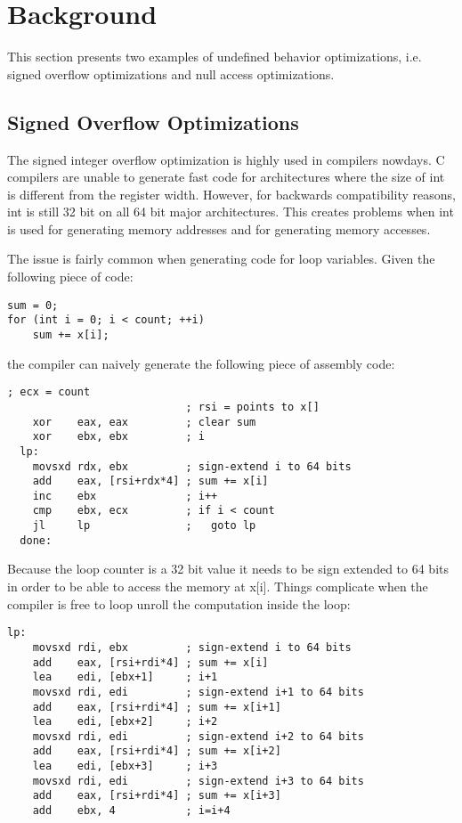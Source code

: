 \section{Background} \label{sec:bg}

This section presents two examples of undefined behavior optimizations,
i.e. signed overflow optimizations and null access optimizations.

\subsection{Signed Overflow Optimizations}
The signed integer overflow optimization is highly used in compilers
nowdays. C compilers are unable to generate fast code for
architectures where the size of int is different from the register
width. However, for backwards compatibility reasons, int is still 32 bit
on all 64 bit major architectures. This creates problems when int is
used for generating memory addresses and for generating memory accesses.

The issue is fairly common when generating code for loop variables.
Given the following piece of code:
\begin{lstlisting}[style=Cstyle, caption={}, label={}]
sum = 0;
for (int i = 0; i < count; ++i)
	sum += x[i];
\end{lstlisting}
the compiler can naively generate the following piece of assembly code:
\begin{lstlisting}[style=Cstyle, caption={}, label={}]
                            ; ecx = count
                            ; rsi = points to x[]
    xor    eax, eax         ; clear sum
    xor    ebx, ebx         ; i
  lp:
    movsxd rdx, ebx         ; sign-extend i to 64 bits
    add    eax, [rsi+rdx*4] ; sum += x[i]
    inc    ebx              ; i++
    cmp    ebx, ecx         ; if i < count
    jl     lp               ;   goto lp
  done:
\end{lstlisting}

Because the loop counter is a 32 bit value it needs to be sign extended
to 64 bits in order to be able to access the memory at x[i]. Things
complicate when the compiler is free to loop unroll the computation
inside the loop:
\begin{lstlisting}[style=Cstyle, caption={}, label={}]
  lp:
    movsxd rdi, ebx         ; sign-extend i to 64 bits
    add    eax, [rsi+rdi*4] ; sum += x[i]
    lea    edi, [ebx+1]     ; i+1
    movsxd rdi, edi         ; sign-extend i+1 to 64 bits
    add    eax, [rsi+rdi*4] ; sum += x[i+1]
    lea    edi, [ebx+2]     ; i+2
    movsxd rdi, edi         ; sign-extend i+2 to 64 bits
    add    eax, [rsi+rdi*4] ; sum += x[i+2]
    lea    edi, [ebx+3]     ; i+3
    movsxd rdi, edi         ; sign-extend i+3 to 64 bits
    add    eax, [rsi+rdi*4] ; sum += x[i+3]
    add    ebx, 4           ; i=i+4
\end{lstlisting}

